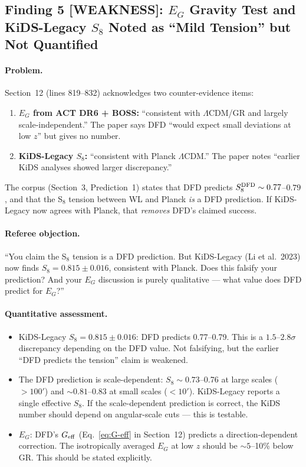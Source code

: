 \subsection*{Finding 5 [WEAKNESS]:
$E_G$ Gravity Test and KiDS-Legacy $S_8$ Noted as ``Mild Tension''
but Not Quantified}

\paragraph{Problem.}
Section~12 (lines 819--832) acknowledges two counter-evidence items:

\begin{enumerate}
\item \textbf{$E_G$ from ACT DR6 + BOSS:} ``consistent with
  $\Lambda$CDM/GR and largely scale-independent.''  The paper says DFD
  ``would expect small deviations at low $z$'' but gives no number.
\item \textbf{KiDS-Legacy $S_8$:} ``consistent with Planck $\Lambda$CDM.''
  The paper notes ``earlier KiDS analyses showed larger discrepancy.''
\end{enumerate}

The corpus (Section~3, Prediction~1) states that DFD predicts
$S_8^{\rm DFD} \sim 0.77$--$0.79$, and that the S$_8$ tension between
WL and Planck \emph{is} a DFD prediction.  If KiDS-Legacy now agrees
with Planck, that \emph{removes} DFD's claimed success.

\paragraph{Referee objection.}
``You claim the S$_8$ tension is a DFD prediction.  But KiDS-Legacy
(Li et al.\ 2023) now finds $S_8 = 0.815 \pm 0.016$, consistent with
Planck.  Does this falsify your prediction?  And your $E_G$ discussion
is purely qualitative --- what value does DFD predict for $E_G$?''

\paragraph{Quantitative assessment.}
\begin{itemize}
\item KiDS-Legacy $S_8 = 0.815 \pm 0.016$:  DFD predicts 0.77--0.79.
  This is a $1.5$--$2.8\sigma$ discrepancy depending on the DFD value.
  Not falsifying, but the earlier ``DFD predicts the tension'' claim
  is weakened.
\item The DFD prediction is scale-dependent: $S_8 \sim 0.73$--0.76
  at large scales ($> 100'$) and $\sim 0.81$--0.83 at small scales
  ($< 10'$).  KiDS-Legacy reports a single effective $S_8$.  If the
  scale-dependent prediction is correct, the KiDS number should
  depend on angular-scale cuts --- this is testable.
\item $E_G$: DFD's $G_{\rm eff}$ (Eq.~\eqref{eq:G-eff} in Section~12)
  predicts a direction-dependent correction.  The isotropically
  averaged $E_G$ at low $z$ should be $\sim 5$--10\% below GR.
  This should be stated explicitly.
\end{itemize}


